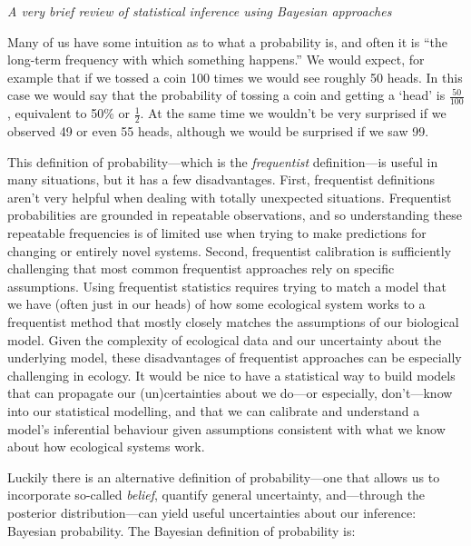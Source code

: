 \documentclass[11pt]{article}
\begin{document}
{\emph{A very brief review of statistical inference using Bayesian approaches}

Many of us have some intuition as to what a probability is, and often it is ``the long-term frequency with which something happens.'' We would expect, for example that if we tossed a coin 100 times we would see roughly 50 heads.  In this case we would say that the probability of tossing a coin and getting a `head' is $\frac{50}{100}$, equivalent to 50\% or $\frac{1}{2}$. At the same time we wouldn’t be very surprised if we observed 49 or even 55 heads, although we would be surprised if we saw 99.

This definition of probability---which is the \emph{frequentist} definition---is useful in many situations, but it has a few disadvantages. First, frequentist definitions aren't very helpful when dealing with totally unexpected situations. Frequentist probabilities are grounded in repeatable observations, and so understanding these repeatable frequencies is of limited use when trying to make predictions for changing or entirely novel systems. Second, frequentist calibration is sufficiently challenging that most common frequentist approaches rely on specific assumptions. Using frequentist statistics requires trying to match a model that we have (often just in our heads) of how some ecological system works to a frequentist method that mostly closely matches the assumptions of our biological model. Given the complexity of ecological data and our uncertainty about the underlying model, these disadvantages of frequentist approaches can be especially challenging in ecology. It would be nice to have a statistical way to build models that can propagate our (un)certainties about we do---or especially, don't---know into our statistical modelling, and that we can calibrate and understand a model's inferential behaviour given assumptions consistent with what we know about how ecological systems work. %

Luckily there is an alternative definition of probability---one that allows us to incorporate so-called \emph{belief}, quantify general uncertainty, and---through the posterior distribution---can yield useful uncertainties about our inference: Bayesian probability. The Bayesian definition of probability is:

}
\end{document}
